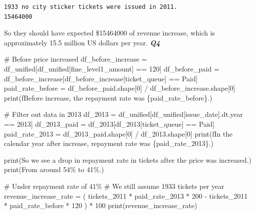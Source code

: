 \documentclass[
  letterpaper,
  DIV=11,
  numbers=noendperiod]{scrartcl}
\newenvironment{Shaded}{\begin{snugshade}}{\end{snugshade}}
\newcommand{\BuiltInTok}[1]{\textcolor[rgb]{0.00,0.23,0.31}{#1}}
\newcommand{\CommentTok}[1]{\textcolor[rgb]{0.37,0.37,0.37}{#1}}
\newcommand{\DecValTok}[1]{\textcolor[rgb]{0.68,0.00,0.00}{#1}}
\newcommand{\NormalTok}[1]{\textcolor[rgb]{0.00,0.23,0.31}{#1}}
\newcommand{\OperatorTok}[1]{\textcolor[rgb]{0.37,0.37,0.37}{#1}}
\newcommand{\SpecialCharTok}[1]{\textcolor[rgb]{0.37,0.37,0.37}{#1}}
\newcommand{\SpecialStringTok}[1]{\textcolor[rgb]{0.13,0.47,0.30}{#1}}
\newcommand{\StringTok}[1]{\textcolor[rgb]{0.13,0.47,0.30}{#1}}
\begin{document}
\begin{verbatim}
1933 no city sticker tickets were issued in 2011.
15464000
\end{verbatim}

So they should have expected \$15464000 of revenue increase, which is
approximately 15.5 million US dollars per year. \newpage
\textbf{\emph{Q4}}

\begin{Shaded}
\begin{Highlighting}[]
\CommentTok{\# Before price increased}
\NormalTok{df\_before\_increase }\OperatorTok{=}\NormalTok{ df\_unified[df\_unified[}\StringTok{\textquotesingle{}fine\_level1\_amount\textquotesingle{}}\NormalTok{] }\OperatorTok{==} \DecValTok{120}\NormalTok{]}
\NormalTok{df\_before\_paid }\OperatorTok{=}\NormalTok{ df\_before\_increase[df\_before\_increase[}\StringTok{\textquotesingle{}ticket\_queue\textquotesingle{}}\NormalTok{] }\OperatorTok{==} \StringTok{\textquotesingle{}Paid\textquotesingle{}}\NormalTok{]}
\NormalTok{paid\_rate\_before }\OperatorTok{=}\NormalTok{ df\_before\_paid.shape[}\DecValTok{0}\NormalTok{] }\OperatorTok{/}\NormalTok{ df\_before\_increase.shape[}\DecValTok{0}\NormalTok{]}
\BuiltInTok{print}\NormalTok{(}\SpecialStringTok{f\textquotesingle{}Before increase, the repayment rate was }\SpecialCharTok{\{}\NormalTok{paid\_rate\_before}\SpecialCharTok{\}}\SpecialStringTok{.\textquotesingle{}}\NormalTok{)}

\CommentTok{\# Filter out data in 2013}
\NormalTok{df\_2013 }\OperatorTok{=}\NormalTok{ df\_unified[df\_unified[}\StringTok{\textquotesingle{}issue\_date\textquotesingle{}}\NormalTok{].dt.year }\OperatorTok{==} \DecValTok{2013}\NormalTok{]}
\NormalTok{df\_2013\_paid }\OperatorTok{=}\NormalTok{ df\_2013[df\_2013[}\StringTok{\textquotesingle{}ticket\_queue\textquotesingle{}}\NormalTok{] }\OperatorTok{==} \StringTok{\textquotesingle{}Paid\textquotesingle{}}\NormalTok{]}
\NormalTok{paid\_rate\_2013 }\OperatorTok{=}\NormalTok{ df\_2013\_paid.shape[}\DecValTok{0}\NormalTok{] }\OperatorTok{/}\NormalTok{ df\_2013.shape[}\DecValTok{0}\NormalTok{]}
\BuiltInTok{print}\NormalTok{(}\SpecialStringTok{f\textquotesingle{}In the calendar year after increase, repayment rate was }\SpecialCharTok{\{}\NormalTok{paid\_rate\_2013}\SpecialCharTok{\}}\SpecialStringTok{.\textquotesingle{}}\NormalTok{)}

\BuiltInTok{print}\NormalTok{(}\StringTok{\textquotesingle{}So we see a drop in repayment rate in tickets after the price was increased.\textquotesingle{}}\NormalTok{)}
\BuiltInTok{print}\NormalTok{(}\StringTok{\textquotesingle{}From around 54\% to 41\%.\textquotesingle{}}\NormalTok{)}

\CommentTok{\# Under repayment rate of 41\%}
\CommentTok{\# We still assume 1933 tickets per year}
\NormalTok{revenue\_increase\_rate }\OperatorTok{=}\NormalTok{ (}
\NormalTok{    tickets\_2011 }\OperatorTok{*}\NormalTok{ paid\_rate\_2013 }\OperatorTok{*} \DecValTok{200} \OperatorTok{{-}}\NormalTok{ tickets\_2011 }\OperatorTok{*}\NormalTok{ paid\_rate\_before }\OperatorTok{*} \DecValTok{120}
\NormalTok{    ) }\OperatorTok{*} \DecValTok{100} 
\BuiltInTok{print}\NormalTok{(revenue\_increase\_rate)}
\end{Highlighting}
\end{Shaded}
\end{document}
